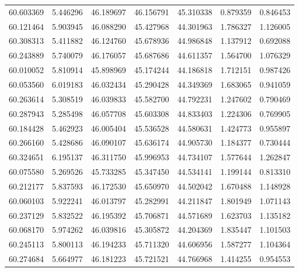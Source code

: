 \begin{tabular}{rrrrrrr}
 60.603369 &   5.446296 &         46.189697 &         46.156791 &         45.310338 &  0.879359 &  0.846453 \\
 60.121464 &   5.903945 &         46.088290 &         45.427968 &         44.301963 &  1.786327 &  1.126005 \\
 60.308313 &   5.411882 &         46.124760 &         45.678936 &         44.986848 &  1.137912 &  0.692088 \\
 60.243889 &   5.740079 &         46.176057 &         45.687686 &         44.611357 &  1.564700 &  1.076329 \\
 60.010052 &   5.810914 &         45.898969 &         45.174244 &         44.186818 &  1.712151 &  0.987426 \\
 60.053560 &   6.019183 &         46.032434 &         45.290428 &         44.349369 &  1.683065 &  0.941059 \\
 60.263614 &   5.308519 &         46.039833 &         45.582700 &         44.792231 &  1.247602 &  0.790469 \\
 60.287943 &   5.285498 &         46.057708 &         45.603308 &         44.833403 &  1.224306 &  0.769905 \\
 60.184428 &   5.462923 &         46.005404 &         45.536528 &         44.580631 &  1.424773 &  0.955897 \\
 60.266160 &   5.428686 &         46.090107 &         45.636174 &         44.905730 &  1.184377 &  0.730444 \\
 60.324651 &   6.195137 &         46.311750 &         45.996953 &         44.734107 &  1.577644 &  1.262847 \\
 60.075580 &   5.269526 &         45.733285 &         45.347450 &         44.534141 &  1.199144 &  0.813310 \\
 60.212177 &   5.837593 &         46.172530 &         45.650970 &         44.502042 &  1.670488 &  1.148928 \\
 60.060103 &   5.922241 &         46.013797 &         45.282991 &         44.211847 &  1.801949 &  1.071143 \\
 60.237129 &   5.832522 &         46.195392 &         45.706871 &         44.571689 &  1.623703 &  1.135182 \\
 60.068170 &   5.974262 &         46.039816 &         45.305872 &         44.204369 &  1.835447 &  1.101503 \\
 60.245113 &   5.800113 &         46.194233 &         45.711320 &         44.606956 &  1.587277 &  1.104364 \\
 60.274684 &   5.664977 &         46.181223 &         45.721521 &         44.766968 &  1.414255 &  0.954553 \\

\end{tabular}
